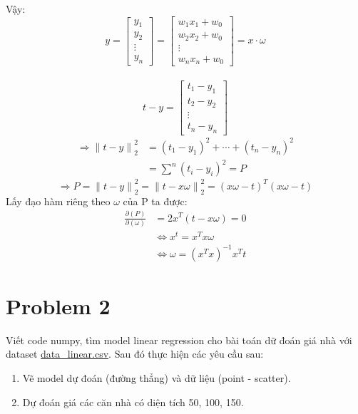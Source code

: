 \documentclass[a4paper, 12pt]{article}  %
\begin{document}
Vậy:
$$
y =
\begin{bmatrix}
    y_1\\
    y_2\\
    \vdots\\
    y_n
\end{bmatrix}
=
\begin{bmatrix}
    w_1x_1 + w_0\\
    w_2x_2 + w_0\\
    \vdots\\
    w_nx_n + w_0
\end{bmatrix}
= x \cdot \omega
$$
\\
$$
t -y = 
\begin{bmatrix}
    t_1 - y_1\\
    t_2 - y_2\\
    \vdots\\
    t_n - y_n
\end{bmatrix}
$$
\begin{align*}
    \Longrightarrow {\lVert t - y \rVert}_2^2 &= (t_1 - y_1)^2 + \cdots + (t_n - y_n)^2 \\
    &= \sum^n (t_i - y_i)^2 = P
\end{align*}
\[\Longrightarrow P = {\lVert t - y \rVert}_2^2 = {\lVert t - x\omega \rVert}_2^2 = (x\omega - t)^T(x\omega - t)\]
Lấy đạo hàm riêng theo $\omega$ của P ta được:
\begin{align*}
\frac{\partial(P)}{\partial (\omega)} &= 2x^T(t-x\omega) = 0\\
    &\Longleftrightarrow x^t = x^Tx \omega\\ 
    &\Longleftrightarrow \omega = (x^Tx)^{-1}x^Tt  
\end{align*}

\section{Problem 2}

Viết code numpy, tìm model linear regression cho bài toán dữ đoán giá nhà với dataset \href{https://github.com/nttuan8/DL_Tutorial/blob/master/L1/data_linear.csv}{data\_linear.csv}. Sau đó thực hiện các yêu cầu sau:
\begin{enumerate}[label=\alph*.]
    \item Vẽ model dự đoán (đường thẳng) và dữ liệu (point - scatter).
    \item Dự đoán giá các căn nhà có diện tích 50, 100, 150.
\end{enumerate}
\end{document}
